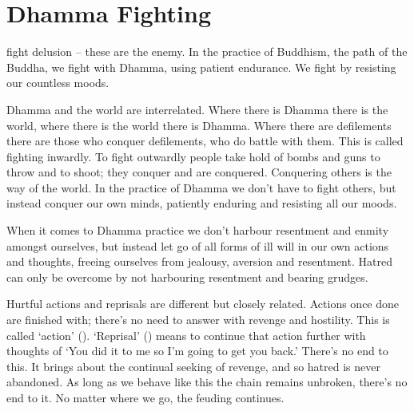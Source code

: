 
\chapter{Dhamma Fighting}

 fight delusion -- these are the enemy. In the practice of Buddhism, the path of the Buddha, we fight with Dhamma, using patient endurance. We fight by resisting our countless moods. 

Dhamma and the world are interrelated. Where there is Dhamma there is the world, where there is the world there is Dhamma. Where there are defilements there are those who conquer defilements, who do battle with them. This is called fighting inwardly. To fight outwardly people take hold of bombs and guns to throw and to shoot; they conquer and are conquered. Conquering others is the way of the world. In the practice of Dhamma we don't have to fight others, but instead conquer our own minds, patiently enduring and resisting all our moods. 

When it comes to Dhamma practice we don't harbour resentment and enmity amongst ourselves, but instead let go of all forms of ill will in our own actions and thoughts, freeing ourselves from jealousy, aversion and resentment. Hatred can only be overcome by not harbouring resentment and bearing grudges. 

Hurtful actions and reprisals are different but closely related. Actions once done are finished with; there's no need to answer with revenge and hostility. This is called `action' (). `Reprisal' () means to continue that action further with thoughts of `You did it to me so I'm going to get you back.' There's no end to this. It brings about the continual seeking of revenge, and so hatred is never abandoned. As long as we behave like this the chain remains unbroken, there's no end to it. No matter where we go, the feuding continues. 

